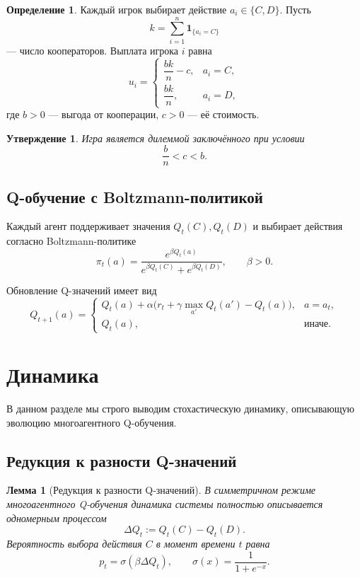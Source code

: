\documentclass[12pt,a4paper]{article}
\newtheorem{lemma}{Лемма}
\newtheorem{proposition}{Утверждение}
\theoremstyle{definition}
\newtheorem{definition}{Определение}
\begin{document}
\begin{definition}
Каждый игрок выбирает действие $a_i \in \{C,D\}$.
Пусть
\[
k = \sum_{i=1}^n \mathbf{1}_{\{a_i=C\}}
\]
— число кооператоров.
Выплата игрока $i$ равна
\[
u_i =
\begin{cases}
\dfrac{b k}{n} - c, & a_i = C,\\[0.4em]
\dfrac{b k}{n}, & a_i = D,
\end{cases}
\]
где $b>0$ — выгода от кооперации, $c>0$ — её стоимость.
\end{definition}

\begin{proposition}
Игра является дилеммой заключённого при условии
\[
\frac{b}{n} < c < b.
\]
\end{proposition}

\subsection{Q-обучение с Boltzmann-политикой}

Каждый агент поддерживает значения
$Q_t(C), Q_t(D)$ и выбирает действия согласно
Boltzmann-политике
\[
\pi_t(a)
=
\frac{e^{\beta Q_t(a)}}
{e^{\beta Q_t(C)} + e^{\beta Q_t(D)}},
\qquad \beta>0.
\]

Обновление Q-значений имеет вид
\[
Q_{t+1}(a) =
\begin{cases}
Q_t(a) + \alpha
\bigl(
r_t + \gamma \max_{a'} Q_t(a') - Q_t(a)
\bigr),
& a=a_t,\\
Q_t(a), & \text{иначе}.
\end{cases}
\]

\section{Динамика}

В данном разделе мы строго выводим стохастическую динамику,
описывающую эволюцию многоагентного Q-обучения.

\subsection{Редукция к разности Q-значений}

\begin{lemma}[Редукция к разности Q-значений]
\label{lem:reduction}
В симметричном режиме многоагентного Q-обучения
динамика системы полностью описывается
одномерным процессом
\[
\Delta Q_t := Q_t(C) - Q_t(D).
\]
Вероятность выбора действия $C$ в момент времени $t$ равна
\[
p_t = \sigma(\beta \Delta Q_t),
\qquad
\sigma(x) = \frac{1}{1+e^{-x}}.
\]
\end{lemma}
\end{document}
